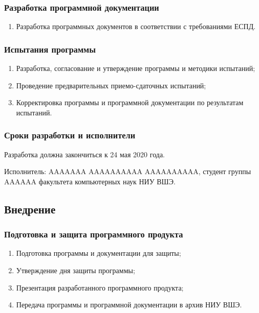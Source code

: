 \documentclass[a4paper,12pt,reqno]{article}
\begin{document}
      \subsubsection*{Разработка программной документации}
      \begin{enumerate}
        \item Разработка программных документов в соответствии с требованиями ЕСПД.
      \end{enumerate}
      \subsubsection*{Испытания программы}
      \begin{enumerate}
        \item Разработка, согласование и утверждение программы и методики испытаний;
        \item Проведение предварительных приемо-сдаточных испытаний;
        \item Корректировка программы и программной документации по результатам испытаний.
      \end{enumerate}
      \subsubsection*{Сроки разработки и исполнители}
      Разработка должна закончиться к 24 мая 2020 года.

      Исполнитель: AAAAAAA AAAAAAAAAA AAAAAAAAAA, студент группы AAAAAA факультета компьютерных наук НИУ ВШЭ.
    \subsection{Внедрение}
      \subsubsection*{Подготовка и защита программного продукта}
      \begin{enumerate}
        \item Подготовка программы и документации для защиты;
        \item Утверждение дня защиты программы;
        \item Презентация разработанного программного продукта;
        \item Передача программы и программной документации в архив НИУ ВШЭ.
      \end{enumerate}

\end{document}
